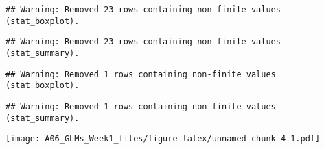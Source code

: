 \documentclass[
]{article}
\begin{document}
\begin{verbatim}
## Warning: Removed 23 rows containing non-finite values (stat_boxplot).
\end{verbatim}

\begin{verbatim}
## Warning: Removed 23 rows containing non-finite values (stat_summary).
\end{verbatim}

\begin{verbatim}
## Warning: Removed 1 rows containing non-finite values (stat_boxplot).
\end{verbatim}

\begin{verbatim}
## Warning: Removed 1 rows containing non-finite values (stat_summary).
\end{verbatim}

\texttt{[image: A06\_GLMs\_Week1\_files/figure-latex/unnamed-chunk-4-1.pdf]}
\end{document}
